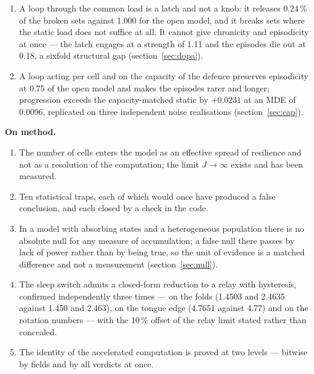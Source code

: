 \begin{enumerate}[leftmargin=1.3em,itemsep=2pt,topsep=2pt]
\item A loop through the common load is a latch and not a knob: it releases 0.24\,\% of the broken sets against 1.000 for the open model, and it breaks sets where the static load does not suffice at all. It cannot give chronicity and episodicity at once --- the latch engages at a strength of 1.11 and the episodes die out at 0.18, a sixfold structural gap (section~\ref{sec:dopa}).
\item A loop acting per cell and on the capacity of the defence preserves episodicity at 0.75 of the open model and makes the episodes rarer and longer; progression exceeds the capacity-matched static by $+0.0231$ at an MDE of $0.0096$, replicated on three independent noise realisations (section~\ref{sec:cap}).
\end{enumerate}

\textbf{On method.}
\begin{enumerate}[leftmargin=1.3em,itemsep=2pt,topsep=2pt,resume]
\item The number of cells enters the model as an effective spread of resilience and not as a resolution of the computation; the limit $J\to\infty$ exists and has been measured.
\item Ten statistical traps, each of which would once have produced a false conclusion, and each closed by a check in the code.
\item In a model with absorbing states and a heterogeneous population there is no absolute null for any measure of accumulation; a false null there passes by lack of power rather than by being true, so the unit of evidence is a matched difference and not a measurement (section~\ref{sec:null}).
\item The sleep switch admits a closed-form reduction to a relay with hysteresis, confirmed independently three times --- on the folds (1.4503 and 2.4635 against 1.450 and 2.463), on the tongue edge (4.7651 against 4.77) and on the rotation numbers --- with the 10\,\% offset of the relay limit stated rather than concealed.
\item The identity of the accelerated computation is proved at two levels --- bitwise by fields and by all verdicts at once.
\end{enumerate}

